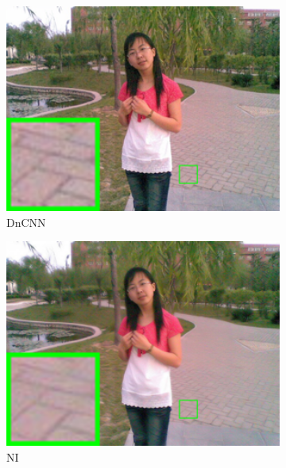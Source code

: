 \begin{figure}
\begin{subfigure}[t]{0.24\textwidth}
        \includegraphics[width=1\textwidth]{images/twsc/nc/resize_br_DnCNN_chinesegirl.png}
\caption{DnCNN}
    \end{subfigure}
\hfill
    \begin{subfigure}[t]{0.24\textwidth}
        \centering
        \includegraphics[width=1\textwidth]{images/twsc/nc/resize_br_NI_chinesegirl.png}
\caption{NI}
    \end{subfigure}
\hfill
    \begin{subfigure}[t]{0.24\textwidth}
        \centering

\end{subfigure}
\end{figure}
